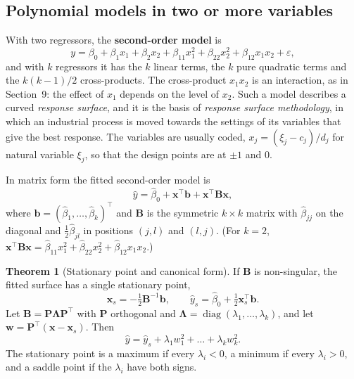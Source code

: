 \documentclass[11pt,a4paper]{article}
\numberwithin{equation}{section}
\theoremstyle{definition}
\newtheorem{thm}{Theorem}[subsection]
\begin{document}
\subsection{Polynomial models in two or more variables}
With two regressors, the \textbf{second-order model} is
\[
y = \beta_0 + \beta_1x_1 + \beta_2x_2 + \beta_{11}x_1^2 + \beta_{22}x_2^2 + \beta_{12}x_1x_2 + \varepsilon ,
\]
and with $k$ regressors it has the $k$ linear terms, the $k$ pure quadratic terms and the $k(k - 1)/2$ cross-products. The
cross-product $x_1x_2$ is an interaction, as in Section~9: the effect of $x_1$ depends on the level of $x_2$. Such a model
describes a curved \emph{response surface}, and it is the basis of \emph{response surface methodology}, in which
an industrial process is moved towards the settings of its variables that give the best response. The
variables are usually coded, $x_j = (\xi_j - c_j)/d_j$ for natural variable $\xi_j$, so that the design points are at $\pm 1$ and
$0$.

In matrix form the fitted second-order model is
\[
\hat y = \hat\beta_0 + \mathbf{x}^\top\mathbf{b} + \mathbf{x}^\top\mathbf{B}\mathbf{x} ,
\]
where $\mathbf{b} = (\hat\beta_1, \dots, \hat\beta_k)^\top$ and $\mathbf{B}$ is the symmetric $k \times k$ matrix with $\hat\beta_{jj}$ on the diagonal and $\frac12\hat\beta_{jl}$
in positions $(j, l)$ and $(l, j)$. (For $k = 2$, $\mathbf{x}^\top\mathbf{Bx} = \hat\beta_{11}x_1^2 + \hat\beta_{22}x_2^2 + \hat\beta_{12}x_1x_2$.)

\begin{thm}[Stationary point and canonical form]\label{thm:canonical}
If $\mathbf{B}$ is non-singular, the fitted surface has a single stationary point,
\[
\mathbf{x}_s = -\tfrac12\mathbf{B}^{-1}\mathbf{b} , \qquad \hat y_s = \hat\beta_0 + \tfrac12\mathbf{x}_s^\top\mathbf{b} .
\]
Let $\mathbf{B} = \mathbf{P}\boldsymbol\Lambda\mathbf{P}^\top$ with $\mathbf{P}$ orthogonal and $\boldsymbol\Lambda = \operatorname{diag}(\lambda_1, \dots, \lambda_k)$, and let
$\mathbf{w} = \mathbf{P}^\top(\mathbf{x} - \mathbf{x}_s)$. Then
\[
\hat y = \hat y_s + \lambda_1w_1^2 + \dots + \lambda_kw_k^2 .
\]
The stationary point is a maximum if every $\lambda_i < 0$, a minimum if every $\lambda_i > 0$, and a saddle point if the $\lambda_i$
have both signs.
\end{thm}
\end{document}
